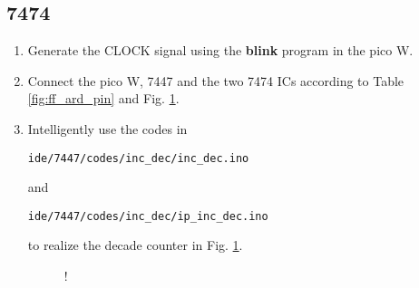 \documentclass[journal]{IEEEtran}
\begin{document}
\subsection{7474}
\begin{enumerate}[label=\arabic*.,ref=\theenumi]
\item
Generate the CLOCK signal using the \textbf{blink} program in the pico W. 
\item
Connect the pico W, 7447 and the two 7474 ICs according to Table \ref{fig:ff_ard_pin} and Fig. \ref{fig:decade_counter}.
\newpage
			\begin{table}[H]
\centering

\caption{}
\label{fig:ff_ard_pin}
\end{table}
%
\item
Intelligently use the codes in 
\begin{lstlisting}
ide/7447/codes/inc_dec/inc_dec.ino
\end{lstlisting}
and
\begin{lstlisting}
ide/7447/codes/inc_dec/ip_inc_dec.ino
\end{lstlisting}
to realize the decade counter in Fig. \ref{fig:decade_counter}.
% 
 \begin{figure}[H]
\begin{center}
\resizebox {0.5\columnwidth} {!} {

}
\end{center}
\caption{}
\label{fig:decade_counter}
\end{figure}
%
\end{enumerate}
\end{document}
